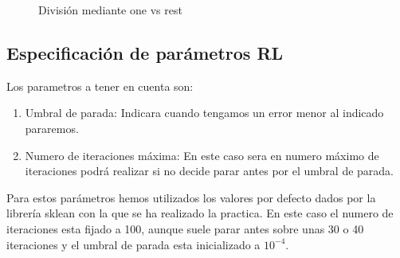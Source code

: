 \documentclass[titlepage]{article}
\begin{document}
	\begin{figure}[H]
		\centering
		\caption{División mediante one vs rest}
	\end{figure}
	
	\subsection{Especificación de parámetros RL}
	Los parametros a tener en cuenta son:
	\begin{enumerate}		
		\item{Umbral de parada:} Indicara cuando tengamos un error menor al indicado pararemos.
		\item{Numero de iteraciones máxima:} En este caso sera en numero máximo de iteraciones podrá realizar si no decide parar antes por el umbral de parada.
	\end{enumerate}
	Para estos parámetros hemos utilizados los valores por defecto dados por la librería sklean con la que se ha realizado la practica. En este caso el numero de iteraciones esta fijado a 100, aunque suele parar antes sobre unas 30 o 40 iteraciones y el umbral de parada esta inicializado a $10^{-4}$.
	
\end{document}
